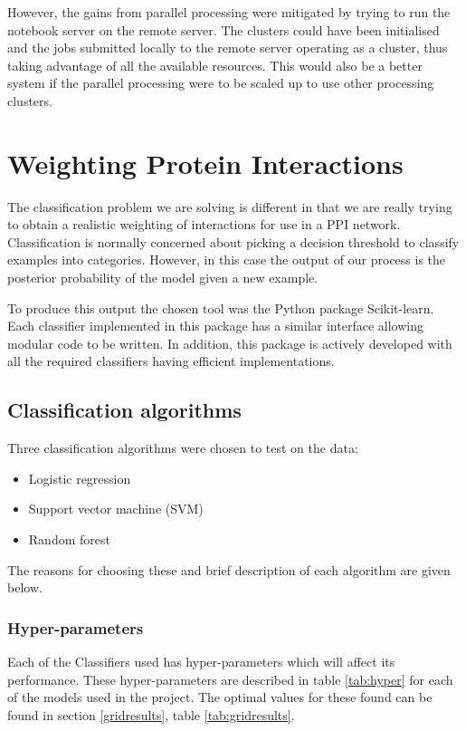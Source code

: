However, the gains from parallel processing were mitigated by trying to run the notebook server on the remote server.
The clusters could have been initialised and the jobs submitted locally to the remote server operating as a cluster, thus taking advantage of all the available resources.
This would also be a better system if the parallel processing were to be scaled up to use other processing clusters.

\section{Weighting Protein Interactions}

The classification problem we are solving is different in that we are really trying to obtain a realistic weighting of interactions for use in a PPI network.
Classification is normally concerned about picking a decision threshold to classify examples into categories.
However, in this case the output of our process is the posterior probability of the model given a new example.

To produce this output the chosen tool was the Python package Scikit-learn\autocite{pedregosa_scikit-learn:_2011}.
Each classifier implemented in this package has a similar interface allowing modular code to be written.
In addition, this package is actively developed with all the required classifiers having efficient implementations.

\subsection{Classification algorithms}

Three classification algorithms were chosen to test on the data:

\begin{itemize}
    \item Logistic regression
    \item Support vector machine (SVM)
    \item Random forest
\end{itemize}

The reasons for choosing these and brief description of each algorithm are given below.

\subsubsection{Hyper-parameters}
Each of the Classifiers used has hyper-parameters which will affect its performance.
These hyper-parameters are described in table \ref{tab:hyper} for each of the models used in the project.
The optimal values for these found can be found in section \ref{gridresults}, table \ref{tab:gridresults}.

